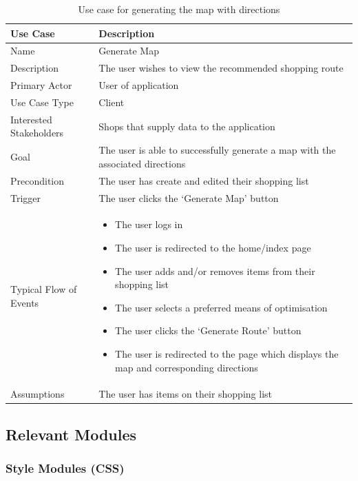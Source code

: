 \documentclass[10pt,twocolumn]{witseiepaper}
\begin{document}
		\begin{table}[h]
			\centering
			\caption{Use case for generating the map with directions}
			\label{uc:map}
			\begin{tabular}{|p{}|p{}|}
				\hline
				\textbf{Use Case} & \textbf{Description} \\ \hline
				Name & Generate Map \\ \hline
				Description & The user wishes to view the recommended shopping route \\ \hline
				Primary Actor & User of application \\ \hline
				Use Case Type & Client \\ \hline
				Interested Stakeholders & Shops that supply data to the application \\ \hline
				Goal & The user is able to successfully generate a map with the associated directions \\ \hline
				Precondition & The user has create and edited their shopping list \\ \hline
				Trigger & The user clicks the `Generate Map' button \\ \hline
				Typical Flow of Events & 
				\begin{itemize}
					\item The user logs in
					\item The user is redirected to the home/index page
					\item The user adds and/or removes items from their shopping list
					\item The user selects a preferred means of optimisation
					\item The user clicks the `Generate Route' button
					\item The user is redirected to the page which displays the map and corresponding directions
				\end{itemize}
				\\ \hline
				Assumptions & The user has items on their shopping list \\
				\hline
			\end{tabular}
		\end{table}
	\clearpage
	\subsection{Relevant Modules}
		
		\subsubsection{Style Modules (CSS)}
		
\end{document}
